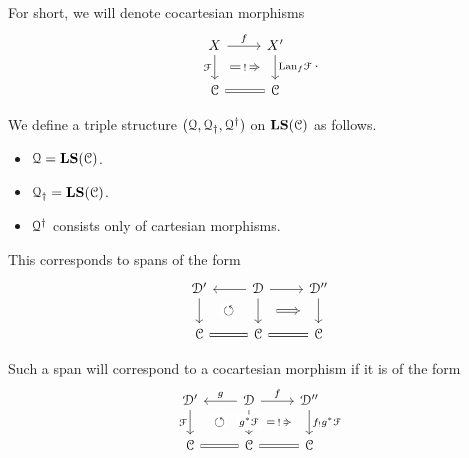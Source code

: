 \documentclass[main.tex]{subfiles}
\begin{document}
For short, we will denote cocartesian morphisms
\begin{equation*}
  \begin{tikzcd}
    X
    \arrow[r, "f"]
    \arrow[d, ""{name=L, right}, "\mathcal{F}"{left}]
    & X'
    \arrow[d, ""{name=R, left}, "\Lan_{f}\mathcal{F}"{right}]
    \\
    \category{C}
    & \category{C}
    \arrow[l, equals]
    \arrow[Rightarrow, from=L, to=R, shorten=1.5ex, "!"{description}]
  \end{tikzcd}.
\end{equation*}

We define a triple structure $(\mathcal{Q}, \mathcal{Q}_{\dagger}, \mathcal{Q}^{\dagger})$ on $\mathbf{LS}(\mathcal{C})$ as follows.
\begin{itemize}
  \item $\mathcal{Q} = \mathbf{LS}(\mathcal{C})$.

  \item $\mathcal{Q}_{\dagger} = \mathbf{LS}(\mathcal{C})$.

  \item $\mathcal{Q}^{\dagger}$ consists only of cartesian morphisms.
\end{itemize}

This corresponds to spans of the form
\begin{equation*}
  \begin{tikzcd}
    \category{D}'
    \arrow[d, ""{name=L, right}]
    & \category{D}
    \arrow[d, ""{name=ML, left}, ""{name=MR, right}]
    \arrow[l, swap]
    \arrow[r]
    & \category{D}''
    \arrow[d, ""{name=R, left}]
    \\
    \category{C}
    \arrow[r, equals]
    &\category{C}
    & \category{C}
    \arrow[l, equals]
    \arrow[Rightarrow, from=MR, to=R, shorten=2ex]
    \arrow[Rightarrow, from=ML, to=L, phantom, "\circlearrowleft"{description}]
  \end{tikzcd}
\end{equation*}

Such a span will correspond to a cocartesian morphism if it is of the form
\begin{equation*}
  \begin{tikzcd}
    \category{D}'
    \arrow[d, "\mathcal{F}"{left}, ""{name=L, right}]
    & \category{D}
    \arrow[d, "g^{*}\mathcal{F}"{description}, ""{name=ML, left}, ""{name=MR, right}]
    \arrow[l, swap, "g"]
    \arrow[r, "f"]
    & \category{D}''
    \arrow[d, ""{name=R, left}, "f_{!}g^{*}\mathcal{F}"{right}]
    \\
    \category{C}
    \arrow[r, equals]
    &\category{C}
    & \category{C}
    \arrow[l, equals]
    \arrow[Rightarrow, from=MR, to=R, shorten=2ex, "!"{description}]
    \arrow[from=ML, to=L, phantom, "\circlearrowleft"{description}]
  \end{tikzcd}
\end{equation*}
\end{document}
